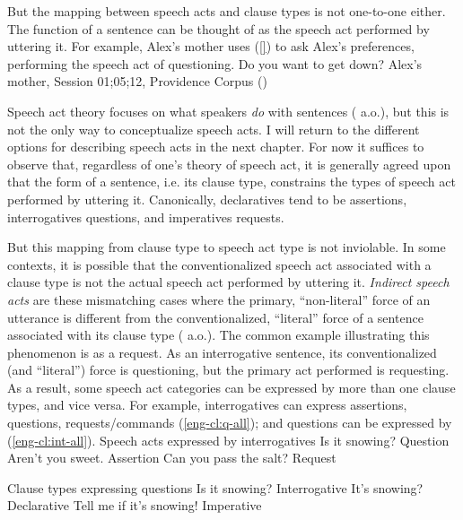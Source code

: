 But the mapping between speech acts and clause types is not one-to-one either. The function of a sentence can be thought of as the speech act performed by uttering it. For example, Alex's mother uses (\ref{}) to ask Alex's preferences, performing the speech act of questioning.
\bex{}
Do you want to get down? \hfill Alex's mother, Session 01;05;12, Providence Corpus (\cite{ProvidenceCorpus})
\eex

Speech act theory focuses on what speakers \emph{do} with sentences (\cite{austin1975things, searle1969} a.o.), but this is not the only way to conceptualize speech acts. I will return to the different options for describing speech acts in the next chapter. For now it suffices to observe that, regardless of one's theory of speech act, it is generally agreed upon that the form of a sentence, i.e. its clause type, constrains the types of speech act performed by uttering it. Canonically, declaratives tend to be assertions, interrogatives questions, and imperatives requests. 


But this mapping from clause type to speech act type is not inviolable. In some contexts, it is possible that the conventionalized speech act associated with a clause type is not the actual speech act performed by uttering it. \emph{Indirect speech acts} are these mismatching cases where the primary, ``non-literal'' force of an utterance is different from the conventionalized, ``literal'' force of a sentence associated with its clause type (\citealt{searle1975tax, searle1976class, bachharnish1979, levinson1983, searlevanderveken1985, portner2018, starr2014, murraystarr2020} a.o.). The common example illustrating this phenomenon is  as a request. As an interrogative sentence, its conventionalized (and ``literal'') force is questioning, but the primary act performed is requesting. As a result, some speech act categories can be expressed by more than one clause types, and vice versa. For example, interrogatives can express assertions, questions, requests/commands (\ref{eng-cl:q-all}); and questions can be expressed by \diis{} (\ref{eng-cl:int-all}).
Speech acts expressed by interrogatives 
\bxl Is it snowing? \hfill Question
\ex Aren't you sweet. \hfill Assertion
\ex Can you pass the salt? \hfill Request
\exl
\eex

Clause types expressing questions
\bxl
Is it snowing? \hfill Interrogative
\ex It's snowing? \hfill Declarative
\ex Tell me if it's snowing! \hfill Imperative
\exl
\eex


